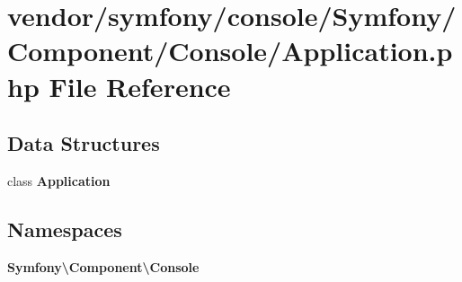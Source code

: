 \section{vendor/symfony/console/\+Symfony/\+Component/\+Console/\+Application.php File Reference}
\label{symfony_2console_2_symfony_2_component_2_console_2_application_8php}
\subsection*{Data Structures}
\begin{DoxyCompactItemize}
\item 
class {\bf Application}
\end{DoxyCompactItemize}
\subsection*{Namespaces}
\begin{DoxyCompactItemize}
\item 
 {\bf Symfony\textbackslash{}\+Component\textbackslash{}\+Console}
\end{DoxyCompactItemize}

